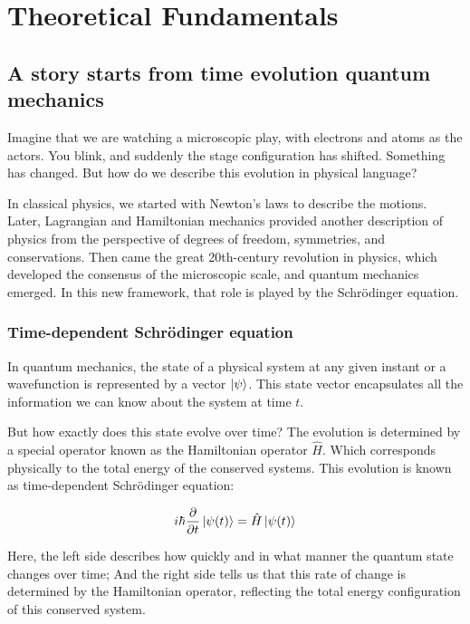 \chapter{Theoretical Fundamentals\label{cha:fundamentals}}

\section{A story starts from time evolution quantum mechanics}

Imagine that we are watching a microscopic play, with electrons and atoms as the actors. You blink, and suddenly the stage configuration has shifted. Something has changed. But how do we describe this evolution in physical language?

In classical physics, we started with Newton’s laws to describe the motions. Later, Lagrangian and Hamiltonian mechanics provided another description of physics from the perspective of degrees of freedom, symmetries, and conservations. Then came the great 20th-century revolution in physics, which developed the consensus of the microscopic scale, and quantum mechanics emerged. In this new framework, that role is played by the Schrödinger equation.

\subsection{Time-dependent Schrödinger equation}

In quantum mechanics, the state of a physical system at any given instant or a wavefunction is represented by a vector $\ket{\psi}$. This state vector encapsulates all the information we can know about the system at time $t$.

But how exactly does this state evolve over time? The evolution is determined by a special operator known as the Hamiltonian operator $\hat{H}$. Which corresponds physically to the total energy of the conserved systems. This evolution is known as time-dependent Schrödinger equation:

\begin{equation}
    i\hbar\frac{\partial}{\partial t}\ket{\psi(t)}=\hat{H}\ket{\psi(t)}
    \label{tdse}
\end{equation}

Here, the left side describes how quickly and in what manner the quantum state changes over time; And the right side tells us that this rate of change is determined by the Hamiltonian operator, reflecting the total energy configuration of this conserved system. 

